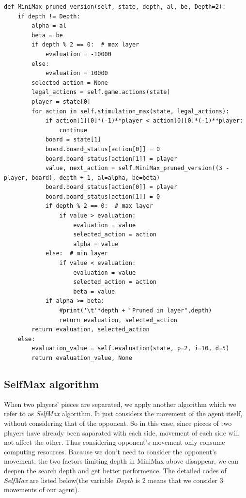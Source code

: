\documentclass[aps,letterpaper,10pt]{article}
\begin{document}
\begin{lstlisting}[style = python]
def MiniMax_pruned_version(self, state, depth, al, be, Depth=2):
	if depth != Depth:
		alpha = al
		beta = be
		if depth % 2 == 0:  # max layer
			evaluation = -10000
		else:
			evaluation = 10000
		selected_action = None
		legal_actions = self.game.actions(state)
		player = state[0]
		for action in self.stimulation_max(state, legal_actions):
			if action[1][0]*(-1)**player < action[0][0]*(-1)**player:
				continue
			board = state[1]
			board.board_status[action[0]] = 0
			board.board_status[action[1]] = player
			value, next_action = self.MiniMax_pruned_version((3 - player, board), depth + 1, al=alpha, be=beta)
			board.board_status[action[0]] = player
			board.board_status[action[1]] = 0
			if depth % 2 == 0:  # max layer
				if value > evaluation:
					evaluation = value
					selected_action = action
					alpha = value
			else:  # min layer
				if value < evaluation:
					evaluation = value
					selected_action = action
					beta = value
			if alpha >= beta:
				#print('\t'*depth + "Pruned in layer",depth)
				return evaluation, selected_action
		return evaluation, selected_action
	else:
		evaluation_value = self.evaluation(state, p=2, i=10, d=5)
		return evaluation_value, None
\end{lstlisting}




\subsection{SelfMax algorithm}
When two players’ pieces are separated, we apply another algorithm which we refer to as {\itshape SelfMax} algorithm.
It just considers the movement of the agent itself, without considering that of the opponent.
So in this case, since pieces of two players have already been saparated with each side, movement of each side will not affect the other. 
Thus considering opponent's movement only consume computing resources.
Bacause we don't need to consider the opponent's movement, the two factors limiting depth in MiniMax above disappear, we can deepen the search depth and get better performence.
The detailed codes of {\itshape SelfMax} are listed below(the variable {\itshape Depth} is 2 means that we consider 3 movements of our agent).
\end{document}
